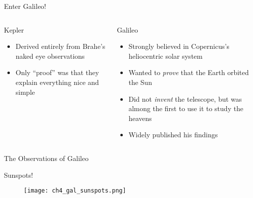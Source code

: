 \documentclass[pdf, aspectratio=169]{beamer}
\begin{document}
\begin{frame}[t]{Enter Galileo!}
  \begin{columns}[t]
	\begin{block}{Kepler}
	  \begin{itemize}
		\item Derived entirely from Brahe's naked eye observations
		\item Only ``proof'' was that they explain everything nice and simple
	  \end{itemize}
	\end{block}
	\begin{block}{Galileo}
	  \begin{itemize}
		\item Strongly believed in Copernicus's heliocentric solar system
		\item Wanted to \emph{prove} that the Earth orbited the Sun
		\item Did not \emph{invent} the telescope, but was almong the first to use it to study the heavens
		\item Widely published his findings
	  \end{itemize}
	\end{block}
  \end{columns}
\end{frame}

\begin{frame}{The Observations of Galileo}
  \begin{center}
  \end{center}
\end{frame}

\begin{frame}{Sunspots!}
  \begin{figure}[h!]
	\centering
	\texttt{[image: ch4\_gal\_sunspots.png]}
  \end{figure}
\end{frame}
\end{document}
